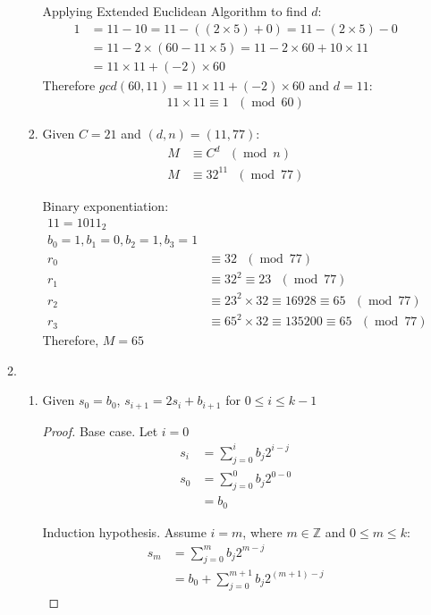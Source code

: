 \documentclass[11pt]{article}
\theoremstyle{definition}
\renewcommand{\pmod}[1]{\mbox{\ $(\ensuremath{\operatorname{mod}}\ {#1})$}}
\newcommand{\Z}{\mathbb{Z}}
\begin{document}
\begin{enumerate}
\begin{enumerate}
\begin{enumerate}
        Applying Extended Euclidean Algorithm to find $d$:
        \begin{align*}
          1 &= 11 - 10 = 11 - ((2 \times 5) + 0) = 11 - (2 \times 5) - 0 \\
            &= 11 - 2 \times (60 - 11 \times 5) = 11 - 2 \times 60 + 10 \times 11 \\
            &= 11 \times 11 + (-2) \times 60
        \end{align*}
        Therefore $gcd(60, 11) = 11 \times 11 + (-2) \times 60$ and $d = 11$:
        \begin{align*}
          11 \times 11 \equiv 1 \pmod{60}
        \end{align*}
      \item
        Given $C = 21$ and $(d, n) = (11, 77)$:
        \begin{align*}
          M &\equiv C^d \pmod{n} \\
          M &\equiv 32^{11} \pmod{77}
        \end{align*}

        Binary exponentiation:
        \begin{align*}
          11 = 1011_{2} \\
          b_0 = 1, b_1 = 0, b_2 = 1, b_3 = 1 \\
          r_0 &\equiv 32 \pmod{77} \\
          r_1 &\equiv 32^2 \equiv 23 \pmod{77} \\
          r_2 &\equiv 23^2 \times 32 \equiv 16928 \equiv 65 \pmod{77} \\
          r_3 &\equiv 65^2 \times 32 \equiv 135200 \equiv 65 \pmod{77}
        \end{align*}
        Therefore, $M = 65$
    \end{enumerate}
  \item
    \begin{enumerate}
      \item
        Given $s_0 = b_0$, $s_{i + 1} = 2s_i + b_{i + 1}$ for $0 \leq i \leq k - 1$
        \begin{proof}
          Base case. Let $i = 0$
          \begin{align*}
            s_i &= \sum^{i}_{j = 0} b_j 2^{i - j} \\
            s_0 &= \sum^{0}_{j = 0} b_j2^{0 - 0} \\
                &= b_0
          \end{align*}

          Induction hypothesis. Assume $i = m$, where $m \in \Z$ and $0 \leq m \leq k$:
          \begin{align*}
            s_m &= \sum^{m}_{j = 0} b_j2^{m - j} \\
                &= b_0 + \sum^{m + 1}_{j = 0} b_j 2^{(m + 1) - j}
          \end{align*}


\end{proof}
\end{enumerate}
\end{enumerate}
\end{enumerate}
\end{document}

